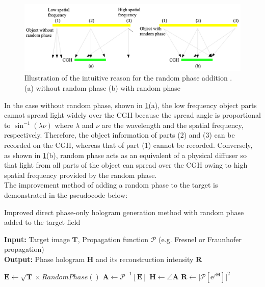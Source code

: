 \begin{figure}[H]
  \centering
    \includegraphics[width=\textwidth]{random_phase_illustration.png}
    \caption{Illustration of the intuitive reason for the random phase addition \cite{Shimobaba2015}. (a) without random phase (b) with random phase }
    \label{fig:random_phase_illustration}
\end{figure}
 In the case without random phase, shown in \cref{fig:random_phase_illustration}(a), the low frequency object parts cannot spread light widely over the CGH because the spread angle is proportional to $\sin^{-1}(\lambda \nu)$ where $\lambda$ and $\nu$ are the wavelength and the spatial frequency, respectively. Therefore, the object information of parts (2) and (3) can be recorded on the CGH, whereas that of part (1) cannot be recorded. Conversely, as shown in \cref{fig:random_phase_illustration}(b), random phase acts as an equivalent of a physical diffuser so that light from all parts of the object can spread over the CGH owing to high spatial frequency provided by the random phase. \cite{Shimobaba2015}\\

The improvement method of adding a random phase to the target is demonstrated in the pseudocode below:

\begin{algorithm}[H]
  \caption{Improved direct phase-only hologram generation method with random phase added to the target field}\label{alg:Naive algorithm with random phase}
  \textbf{Input:} Target image $\textbf{T}$, Propagation function $\mathcal{P}$ (e.g. Fresnel or Fraunhofer propagation)\\
  \textbf{Output:} Phase hologram $\textbf{H}$ and its reconstruction intensity $\textbf{R}$
  \begin{algorithmic}
    \State $\textbf{E} \gets \sqrt{\textbf{T}} \times RandomPhase()$
    \State $\textbf{A} \gets \mathcal{P}^{-1}[\textbf{E}]$
    \State $\textbf{H} \gets \angle \textbf{A}$
    \State $\textbf{R} \gets \vert \mathcal{P}[\mathrm{e}^{j\textbf{H}}] \vert ^2 $
  \end{algorithmic}
\end{algorithm}

